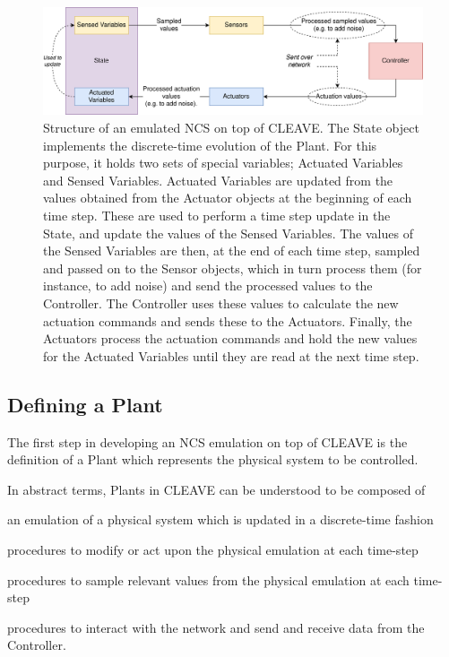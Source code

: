 \begin{figure}
    \centering
    \includegraphics[width=\textwidth]{images/CLEAVE_NCS_structure.png}
    \caption{
        Structure of an emulated NCS on top of CLEAVE.
        The State object implements the discrete-time evolution of the Plant.
        For this purpose, it holds two sets of special variables; Actuated Variables and Sensed Variables.
        Actuated Variables are updated from the values obtained from the Actuator objects at the beginning of each time step.
        These are used to perform a time step update in the State, and update the values of the Sensed Variables.
        The values of the Sensed Variables are then, at the end of each time step, sampled and passed on to the Sensor objects, which in turn process them (for instance, to add noise) and send the processed values to the Controller.
        The Controller uses these values to calculate the new actuation commands and sends these to the Actuators.
        Finally, the Actuators process the actuation commands and hold the new values for the Actuated Variables until they are read at the next time step.
    }\label{fig:cleave:ncs:struct}
\end{figure}

\subsection{Defining a Plant}

The first step in developing an NCS emulation on top of CLEAVE is the definition of a Plant which represents the physical system to be controlled.

In abstract terms, Plants in CLEAVE can be understood to be composed of
\begin{enumerate*}[itemjoin={{; }}, itemjoin*={{; and }}]
    \item\label{item:plant:state} an emulation of a physical system which is updated in a discrete-time fashion
    \item\label{item:plant:actuators} procedures to modify or act upon the physical emulation at each time-step
    \item\label{item:plant:sensors} procedures to sample relevant values from the physical emulation at each time-step
    \item\label{item:plant:network} procedures to interact with the network and send and receive data from the Controller.
\end{enumerate*}

